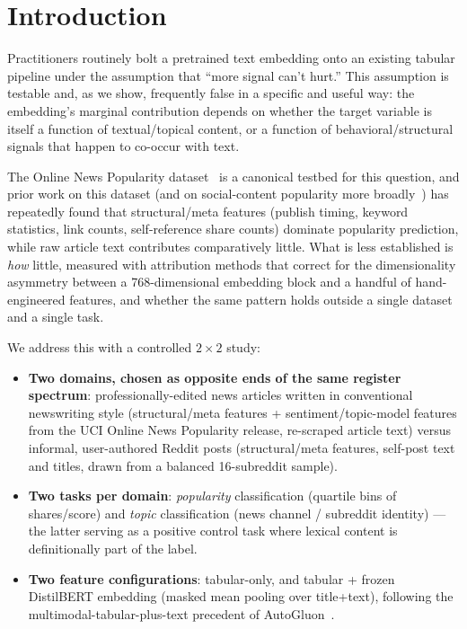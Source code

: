 \documentclass[conference]{IEEEtran}
\begin{document}
\section{Introduction}

Practitioners routinely bolt a pretrained text embedding onto an existing tabular pipeline under the assumption that ``more signal can't hurt.'' This assumption is testable and, as we show, frequently false in a specific and useful way: the embedding's marginal contribution depends on whether the target variable is itself a function of textual/topical content, or a function of behavioral/structural signals that happen to co-occur with text.

The Online News Popularity dataset~\cite{fernandes2015proactive} is a canonical testbed for this question, and prior work on this dataset (and on social-content popularity more broadly~\cite{tan2014effect,lakkaraju2013s,gilbert2010widespread}) has repeatedly found that structural/meta features (publish timing, keyword statistics, link counts, self-reference share counts) dominate popularity prediction, while raw article text contributes comparatively little. What is less established is \emph{how} little, measured with attribution methods that correct for the dimensionality asymmetry between a 768-dimensional embedding block and a handful of hand-engineered features, and whether the same pattern holds outside a single dataset and a single task.

We address this with a controlled $2\times2$ study:

\begin{itemize}
    \item \textbf{Two domains, chosen as opposite ends of the same register spectrum}: professionally-edited news articles written in conventional newswriting style (structural/meta features + sentiment/topic-model features from the UCI Online News Popularity release, re-scraped article text) versus informal, user-authored Reddit posts (structural/meta features, self-post text and titles, drawn from a balanced 16-subreddit sample).
    \item \textbf{Two tasks per domain}: \emph{popularity} classification (quartile bins of shares/score) and \emph{topic} classification (news channel / subreddit identity) --- the latter serving as a positive control task where lexical content is definitionally part of the label.
    \item \textbf{Two feature configurations}: tabular-only, and tabular + frozen DistilBERT embedding (masked mean pooling over title+text), following the multimodal-tabular-plus-text precedent of AutoGluon~\cite{shi2021multimodal}.
\end{itemize}
\end{document}
